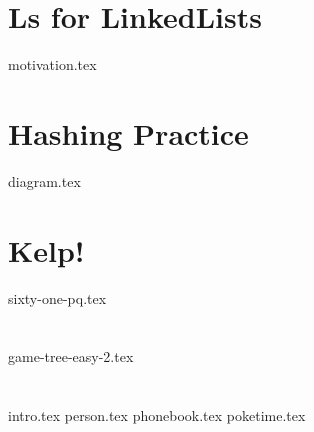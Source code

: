 \documentclass[11pt]{exam}
\begin{document}
\section{Ls for LinkedLists}
\begin{questions}
{motivation.tex}
\end{questions}

\section{Hashing Practice}
\begin{questions}
{diagram.tex}
\end{questions}
\clearpage

\section{Kelp!}
\begin{questions}
{sixty-one-pq.tex}
\end{questions}

\section{}
\begin{questions}
{game-tree-easy-2.tex}
\end{questions}

\section{}
\begin{questions}
{intro.tex}
{person.tex}
{phonebook.tex}
\clearpage
{poketime.tex}
\end{questions}
\end{document}
